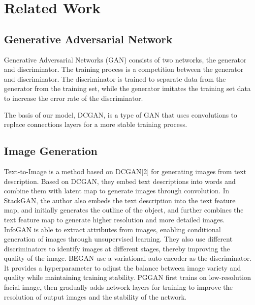 \section{Related Work}


\subsection{Generative Adversarial Network}
Generative Adversarial Networks (GAN) consists of two networks, the generator and discriminator.
The training process is a competition between the generator and discriminator.
The discriminator is trained to separate data from the generator from the training set,
    while the generator imitates the training set data to increase the error rate of the discriminator. 

The basis of our model, DCGAN, is a type of GAN that uses convolutions to replace connections layers for a more stable training process.


\subsection{Image Generation}

Text-to-Image is a method based on DCGAN[2] for generating images from text description.
Based on DCGAN, they embed text descriptions into words and combine them with latent map to generate images through convolution.
In StackGAN, the author also embeds the text description into the text feature map,
    and initially generates the outline of the object,
    and further combines the text feature map to generate higher resolution and more detailed images.
InfoGAN is able to extract attributes from images, enabling conditional generation of images through unsupervised learning.
They also use different discriminators to identify images at different stages, thereby improving the quality of the image.
BEGAN use a variational auto-encoder as the discriminator.
It provides a hyperparameter to adjust the balance between image variety and quality while maintaining training stability.
PGGAN first trains on low-resolution facial image, then gradually adds network layers for training to improve the resolution of output images and the stability of the network.

